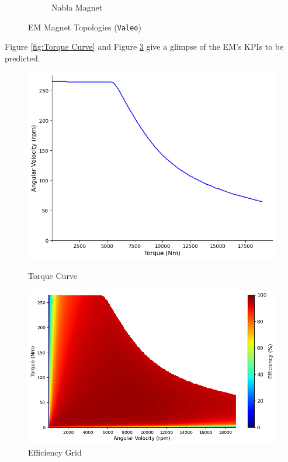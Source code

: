 \documentclass{report} %
\begin{document}
\begin{figure}[H]
\begin{subfigure}{0.32\textwidth}
        \caption{Nabla Magnet}
        \label{fig:Nabla Magnet}
    \end{subfigure}
    \caption{\ac{EM} Magnet Topologies (\texttt{Valeo})}
    \label{fig:EM Magnet Topologies}
\end{figure}

Figure \ref{fig:Torque Curve} and Figure \ref{fig:Efficiency Grid} give a glimpse of the \ac{EM}'s \ac{KPI}s to be predicted.
\begin{figure}[H]
    \centering
    \begin{minipage}[b]{0.44\textwidth}
        \centering
        \includegraphics[width=\textwidth]{./ReportImages/TorqueCurve.png}
        \caption{Torque Curve} %
        \label{fig:Torque Curve}
    \end{minipage}
    \hfill
    \begin{minipage}[b]{0.54\textwidth}
        \centering
        \includegraphics[width=\textwidth]{./ReportImages/EfficiencyGrid.png}
        \caption{Efficiency Grid}
        \label{fig:Efficiency Grid}
    \end{minipage}
\end{figure}
\end{document}
